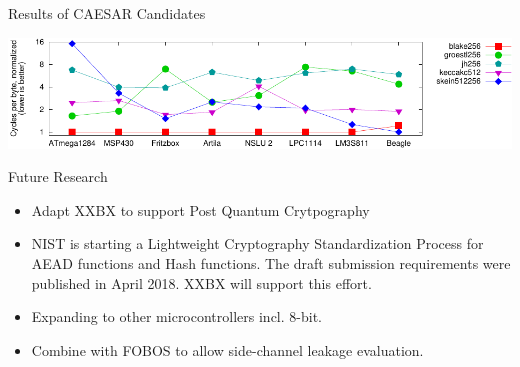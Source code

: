 \documentclass[xcolor=pdftex,dvipsnames,table,final]{beamer}
\begin{document}
\begin{frame}[fragile]{}
\begin{columns}[t, totalwidth=\textwidth]
\begin{column}{.675\linewidth}
\begin{columns}
\begin{column}{.473\linewidth}
\begin{block}{Results of CAESAR Candidates}
\begin{center}
           \includegraphics[width=0.9\linewidth]{../figures/cycles_per_byte}

           \vspace{-1ex}{\small Energy Consumption}
         \end{center}
       \end{block}

       \begin{block}{Future Research}
        \begin{itemize}
          \item Adapt XXBX to support Post Quantum Crytpography
          \item NIST is starting a Lightweight Cryptography Standardization Process for
                AEAD functions and Hash functions. The draft submission requirements 
                were published in April 2018. XXBX will support this effort.
          \item Expanding to other microcontrollers incl. 8-bit.
          \item Combine with FOBOS to allow side-channel leakage evaluation.
        \end{itemize}
       \end{block}

%          
%          
   \end{column}
   \end{columns}


\end{column}
\end{columns}
\end{frame}
\end{document}
